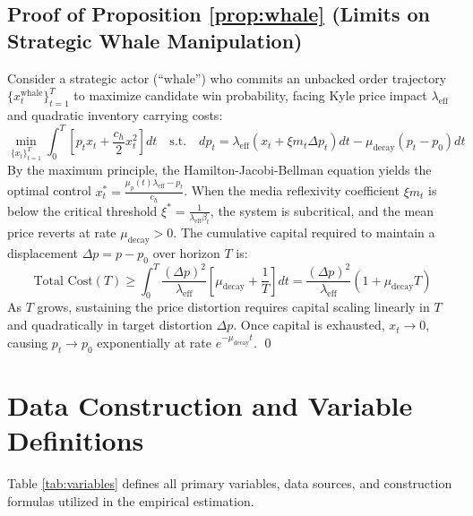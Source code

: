 \documentclass[12pt, a4paper]{article}
\begin{document}
\subsection{Proof of Proposition \ref{prop:whale} (Limits on Strategic Whale Manipulation)}
\label{app:proof_prop4}
Consider a strategic actor (``whale'') who commits an unbacked order trajectory $\{x_t^{\text{whale}}\}_{t=1}^T$ to maximize candidate win probability, facing Kyle price impact $\lambda_{\text{eff}}$ and quadratic inventory carrying costs:
\begin{equation}
\min_{\{x_t\}_{t=1}^T} \int_0^T \left[ p_t x_t + \frac{c_h}{2} x_t^2 \right] dt \quad \text{s.t.} \quad dp_t = \lambda_{\text{eff}} (x_t + \xi m_t \Delta p_t) dt - \mu_{\text{decay}} (p_t - p_0) dt
\end{equation}
By the maximum principle, the Hamilton-Jacobi-Bellman equation yields the optimal control $x_t^* = \frac{\mu_p(t) \lambda_{\text{eff}} - p_t}{c_h}$. When the media reflexivity coefficient $\xi m_t$ is below the critical threshold $\xi^* = \frac{1}{\lambda_{\text{eff}} \beta_t}$, the system is subcritical, and the mean price reverts at rate $\mu_{\text{decay}} > 0$. The cumulative capital required to maintain a displacement $\Delta p = p - p_0$ over horizon $T$ is:
\begin{equation}
\text{Total Cost}(T) \ge \int_0^T \frac{(\Delta p)^2}{\lambda_{\text{eff}}} \left[ \mu_{\text{decay}} + \frac{1}{T} \right] dt = \frac{(\Delta p)^2}{\lambda_{\text{eff}}} \left( 1 + \mu_{\text{decay}} T \right)
\end{equation}
As $T$ grows, sustaining the price distortion requires capital scaling linearly in $T$ and quadratically in target distortion $\Delta p$. Once capital is exhausted, $x_t \to 0$, causing $p_t \to p_0$ exponentially at rate $e^{-\mu_{\text{decay}} t}$. \qed

\newpage
\section{Data Construction and Variable Definitions}
\label{app:data}

Table \ref{tab:variables} defines all primary variables, data sources, and construction formulas utilized in the empirical estimation.
\end{document}
